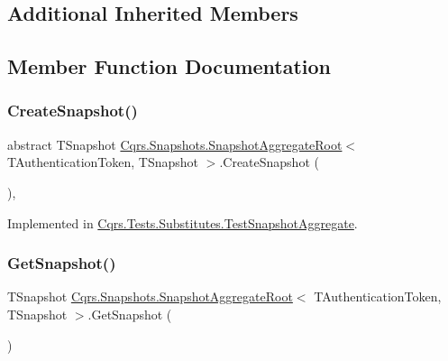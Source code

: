 \subsection*{Additional Inherited Members}


\subsection{Member Function Documentation}
\mbox{\label{classCqrs_1_1Snapshots_1_1SnapshotAggregateRoot_a2d8cd57c7b6c2696d286c6dc5e9f0479_a2d8cd57c7b6c2696d286c6dc5e9f0479}} 
\subsubsection{\texorpdfstring{Create\+Snapshot()}{CreateSnapshot()}}
{\footnotesize\ttfamily abstract T\+Snapshot \hyperlink{classCqrs_1_1Snapshots_1_1SnapshotAggregateRoot}{Cqrs.\+Snapshots.\+Snapshot\+Aggregate\+Root}$<$ T\+Authentication\+Token, T\+Snapshot $>$.Create\+Snapshot (\begin{DoxyParamCaption}{ }\end{DoxyParamCaption})\hspace{0.3cm}{\ttfamily [protected]}, {}}



Implemented in \hyperlink{classCqrs_1_1Tests_1_1Substitutes_1_1TestSnapshotAggregate_a423bba964aa7fe1f8e89fbb153d7db37_a423bba964aa7fe1f8e89fbb153d7db37}{Cqrs.\+Tests.\+Substitutes.\+Test\+Snapshot\+Aggregate}.

\mbox{\label{classCqrs_1_1Snapshots_1_1SnapshotAggregateRoot_a6116e565cb35cee459350a254bb2b893_a6116e565cb35cee459350a254bb2b893}} 
\subsubsection{\texorpdfstring{Get\+Snapshot()}{GetSnapshot()}}
{\footnotesize\ttfamily T\+Snapshot \hyperlink{classCqrs_1_1Snapshots_1_1SnapshotAggregateRoot}{Cqrs.\+Snapshots.\+Snapshot\+Aggregate\+Root}$<$ T\+Authentication\+Token, T\+Snapshot $>$.Get\+Snapshot (\begin{DoxyParamCaption}{ }\end{DoxyParamCaption})}

